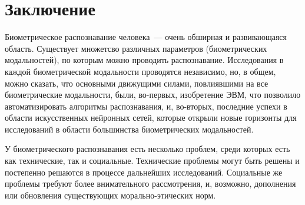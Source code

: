 \documentclass[14pt, a4paper]{extarticle}
\begin{document}
\newpage
\section{Заключение}
Биометрическое распознавание человека~--- очень обширная и развивающаяся область. Существует множетсво различных параметров (биометрических модальностей), по которым можно проводить распознавание. Исследования в каждой биометрической модальности проводятся независимо, но, в общем, можно сказать, что основными движущими силами, повлиявшими на все биометрические модальности, были, во-первых, изобретение ЭВМ, что позволило автоматизировать алгоритмы распознавания, и, во-вторых, последние успехи в области искусственных нейронных сетей, которые открыли новые горизонты для исследований в области большинства биометрических модальностей.

У биометрического распознавания есть несколько проблем, среди которых есть как технические, так и социальные. Технические проблемы могут быть решены и постепенно решаются в процессе дальнейших исследований. Социальные же проблемы требуют более внимательного рассмотрения, и, возможно, дополнения или обновления существующих морально-этических норм.

	
\newpage

\end{document}
